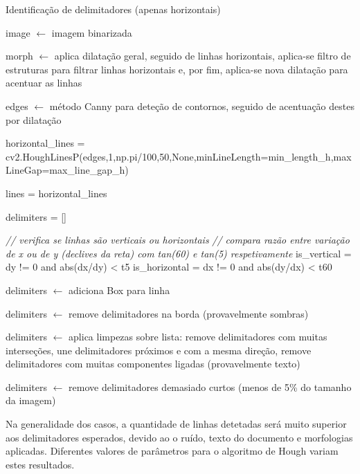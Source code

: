 \begin{breakablealgorithm}
	\caption{Identificação de delimitadores (apenas horizontais)}
	\footnotesize
	\begin{algorithmic}[1]
		
		\State image $\leftarrow$ imagem binarizada
		
		\State morph $\leftarrow$ aplica dilatação geral, seguido de linhas horizontais, aplica-se filtro de estruturas para filtrar linhas horizontais e, por fim, aplica-se nova dilatação para acentuar as linhas
		
		\State edges $\leftarrow$ método Canny para deteção de contornos, seguido de acentuação destes por dilatação
		
		\State horizontal\_lines = cv2.HoughLinesP(edges,1,np.pi/100,50,None,minLineLength=min\_length\_h,maxLineGap=max\_line\_gap\_h)
		
		\State lines = horizontal\_lines
		
		\State delimiters = []
		
			
			\State \textit{// verifica se linhas são verticais ou horizontais}
			\State \textit{// compara razão entre variação de x ou de y (declives da reta) com tan(60) e tan(5) respetivamente}
			\State is\_vertical = dy != 0 and abs(dx/dy) < t5
			\State is\_horizontal = dx != 0 and abs(dy/dx) < t60
			
				\State delimiters $\leftarrow$ adiciona Box para linha
			\EndIf
		\EndFor
		
		\State delimiters $\leftarrow$ remove delimitadores na borda (provavelmente sombras)
		
			\State delimiters $\leftarrow$ aplica limpezas sobre lista: remove delimitadores com muitas interseções, une delimitadores próximos e com a mesma direção, remove delimitadores com muitas componentes ligadas (provavelmente texto)
		\EndIf
		
		\State delimiters $\leftarrow$ remove delimitadores demasiado curtos (menos de 5\% do tamanho da imagem)
		
	\end{algorithmic}
\end{breakablealgorithm}


Na generalidade dos casos, a quantidade de linhas detetadas será muito superior aos delimitadores esperados, devido ao o ruído, texto do documento e morfologias aplicadas. 
Diferentes valores de parâmetros para o algoritmo de Hough variam estes resultados.

